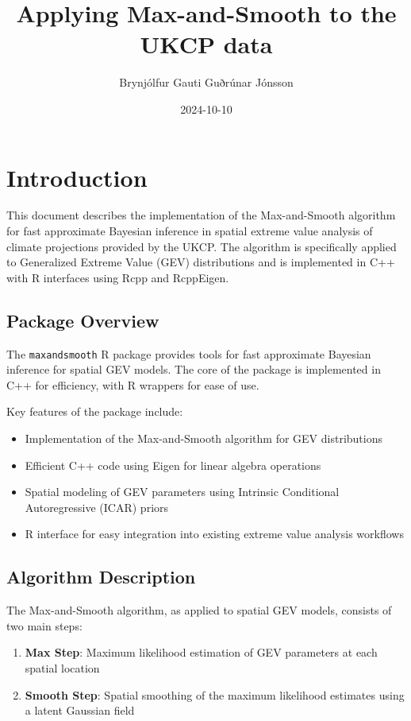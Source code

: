 \documentclass[
  letterpaper,
  DIV=11,
  numbers=noendperiod]{scrartcl}
\title{Applying Max-and-Smooth to the UKCP data}
\author{Brynjólfur Gauti Guðrúnar Jónsson}
\date{2024-10-10}
\providecommand{\tightlist}{%
  \setlength{\itemsep}{0pt}\setlength{\parskip}{0pt}}\usepackage{longtable,booktabs,array}
\begin{document}
\maketitle


\section{Introduction}\label{introduction}

This document describes the implementation of the Max-and-Smooth
algorithm for fast approximate Bayesian inference in spatial extreme
value analysis of climate projections provided by the UKCP. The
algorithm is specifically applied to Generalized Extreme Value (GEV)
distributions and is implemented in C++ with R interfaces using Rcpp and
RcppEigen.

\subsection{Package Overview}\label{package-overview}

The \texttt{maxandsmooth} R package provides tools for fast approximate
Bayesian inference for spatial GEV models. The core of the package is
implemented in C++ for efficiency, with R wrappers for ease of use.

Key features of the package include:

\begin{itemize}
\tightlist
\item
  Implementation of the Max-and-Smooth algorithm for GEV distributions
\item
  Efficient C++ code using Eigen for linear algebra operations
\item
  Spatial modeling of GEV parameters using Intrinsic Conditional
  Autoregressive (ICAR) priors
\item
  R interface for easy integration into existing extreme value analysis
  workflows
\end{itemize}

\subsection{Algorithm Description}\label{algorithm-description}

The Max-and-Smooth algorithm, as applied to spatial GEV models, consists
of two main steps:

\begin{enumerate}
\def\labelenumi{\arabic{enumi}.}
\tightlist
\item
  \textbf{Max Step}: Maximum likelihood estimation of GEV parameters at
  each spatial location
\item
  \textbf{Smooth Step}: Spatial smoothing of the maximum likelihood
  estimates using a latent Gaussian field
\end{enumerate}
\end{document}
